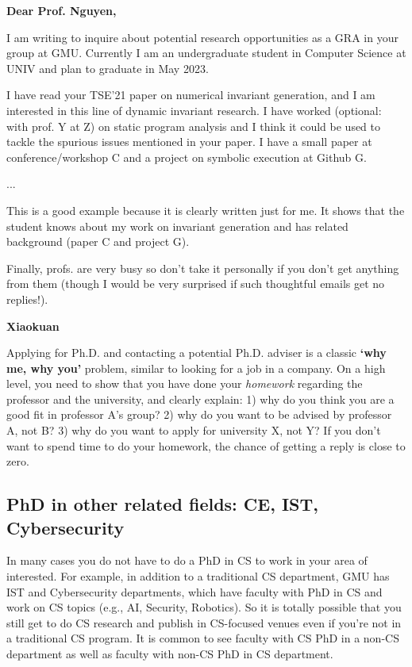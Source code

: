 \documentclass[oneside,11pt]{memoir}
\newenvironment{commentbox}[1][]{
\small
    \begin{mybox}
    {\small \textbf{#1}}
 }{
   \end{mybox}
}
\begin{document}
\begin{commentbox}[Dear Prof. Nguyen,]

I am writing to inquire about potential research opportunities as a GRA in your group at GMU. Currently I am an undergraduate student in Computer Science at UNIV and plan to graduate in May 2023.

 
I have read your TSE'21 paper on numerical invariant generation, and I am interested in this line of dynamic invariant research. I have worked (optional: with prof. Y at Z) on static program analysis and I think it could be used to tackle the spurious issues mentioned in your paper. I have a small paper at conference/workshop C and a project on symbolic execution at Github G.

...

This is a good example because it is clearly written just for me.  It shows that the student knows about my work on invariant generation and has related  background (paper C and project G). 
\end{commentbox}

Finally, profs. are very busy so don't take it personally if you don't get anything from them (though I would be very surprised if such thoughtful emails get no replies!). 


\begin{commentbox}[Xiaokuan]
    Applying for Ph.D. and contacting a potential Ph.D. adviser is a classic \textbf{`why me, why you'} problem, 
similar to looking for a job in a company.
On a high level,
you need to show that you have done your \emph{homework}
regarding the professor and the university,
and clearly explain:
1) why do you think you are a good fit in professor A's group?
2) why do you want to be advised by professor A, not B? 
3) why do you want to apply for university X, not Y?
If you don't want to spend time to do your homework,
the chance of getting a reply is close to zero.
\end{commentbox}

\subsection{PhD in other related fields: CE, IST, Cybersecurity}\label{sec:related-fields}

In many cases you do not have to do a PhD in CS to work in your area of interested. For example, in addition to a traditional CS department, GMU has IST and Cybersecurity departments, which have faculty  with PhD in CS and work on CS topics (e.g., AI, Security, Robotics).  So it is totally possible that you still get to do CS research and publish in CS-focused venues even if you're not in a traditional CS program.  It is  common to see faculty with CS PhD in a non-CS department as well as faculty with non-CS PhD in CS department.  
\end{document}
